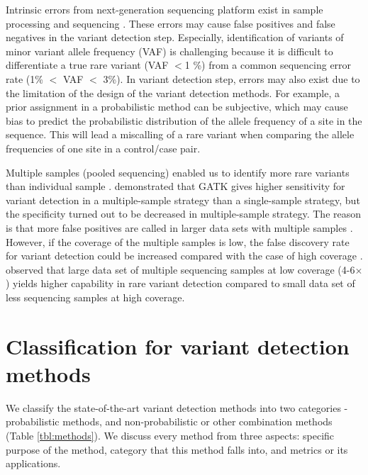 \documentclass[11pt,reqno]{amsart}
\begin{document}
Intrinsic errors from next-generation sequencing platform exist in sample processing and sequencing \citep{Olson2015}.
These errors may cause false positives and false negatives in the variant detection step.
Especially, identification of variants of minor variant allele frequency (VAF) is challenging because it is difficult to differentiate a true rare variant (VAF $<$1 \%) from a common sequencing error rate (1\% $<$ VAF $<$ 3\%).
In variant detection step, errors may also exist due to the limitation of the design of the variant detection methods.
For example, a prior assignment in a probabilistic method can be subjective, which may cause bias to predict the probabilistic distribution of the allele frequency of a site in the sequence.
This will lead a miscalling of a rare variant when comparing the allele frequencies of one site in a control/case pair.

Multiple samples (pooled sequencing) enabled us to identify more rare variants than individual sample \citep{Bao2014, liu2012steps}.
\citep{liu2013variant} demonstrated that GATK gives higher sensitivity for variant detection in a multiple-sample strategy than a single-sample strategy, but the specificity turned out to be decreased in multiple-sample strategy.
The reason is that more false positives are called in larger data sets with multiple samples \citep{Nielsen2011}.
However, if the coverage of the multiple samples is low, the false discovery rate for variant detection could be increased compared with the case of high coverage \citep{Cheng2014}.
\citep{le2011snp} observed that large data set of multiple sequencing samples at low coverage (4-6$\times$) yields higher capability in rare variant detection compared to small data set of less sequencing samples at high coverage.

\section{Classification for variant detection methods}
We classify the state-of-the-art variant detection methods into two categories - probabilistic methods, and non-probabilistic or other combination methods (Table \ref{tbl:methods}).
We discuss every method from three aspects: specific purpose of the method, category that this method falls into, and metrics or its applications.
\end{document}
